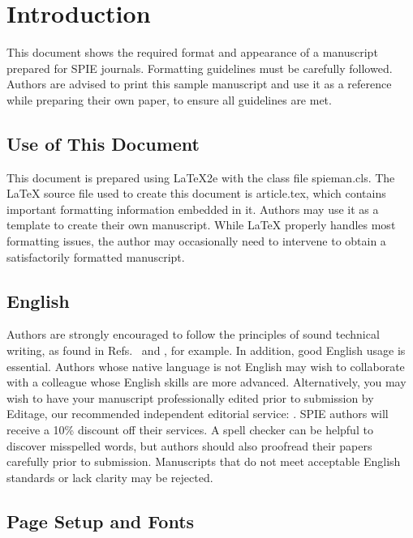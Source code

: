 \section{Introduction}
\label{sect:intro}  %
This document shows the required format and appearance of a manuscript prepared for SPIE journals. Formatting guidelines must be carefully followed. Authors are advised to print this sample manuscript and use it as a reference while preparing their own paper, to ensure all guidelines are met.

\subsection{Use of This Document}

This document is prepared using LaTeX2e \cite{Lamport94,Goossens97} with the class file {\ttfamily spieman.cls}.  The LaTeX source file used to create this document is {\ttfamily article.tex}, which contains important formatting information embedded in it. Authors may use it as a template to create their own manuscript. While LaTeX properly handles most formatting issues, the author may occasionally need to intervene to obtain a satisfactorily  formatted manuscript.

\subsection{English}

Authors are strongly encouraged to follow the principles of sound technical writing, as found in Refs.~ and , for example. In addition, good English usage is essential. Authors whose native language is not English may wish to collaborate with a colleague whose English skills are more advanced. Alternatively, you may wish to have your manuscript professionally edited prior to submission by Editage, our recommended independent editorial service: . SPIE authors will receive a 10\% discount off their services. A spell checker can be helpful to discover misspelled words, but authors should also proofread their papers carefully prior to submission. Manuscripts that do not meet acceptable English standards or lack clarity may be rejected.

\subsection{Page Setup and Fonts}


